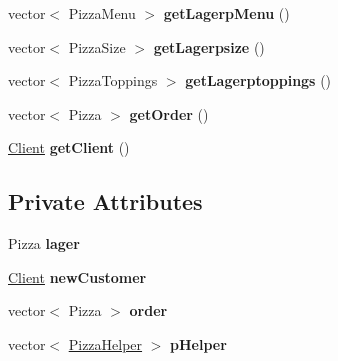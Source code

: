 \begin{CompactItemize}
\item 
\hypertarget{class_sala_89b38b3e2a9835524c9fd21628f485cc}{
vector$<$ Pizza\-Menu $>$ {\bf get\-Lagerp\-Menu} ()}
\label{class_sala_89b38b3e2a9835524c9fd21628f485cc}

\item 
\hypertarget{class_sala_3b0fc00a14ac87f5c78a4ec2f508d67b}{
vector$<$ Pizza\-Size $>$ {\bf get\-Lagerpsize} ()}
\label{class_sala_3b0fc00a14ac87f5c78a4ec2f508d67b}

\item 
\hypertarget{class_sala_aeb754b87d63d395a61539294cbdf064}{
vector$<$ Pizza\-Toppings $>$ {\bf get\-Lagerptoppings} ()}
\label{class_sala_aeb754b87d63d395a61539294cbdf064}

\item 
\hypertarget{class_sala_71e41a58a2a9c2d1927676693909a42c}{
vector$<$ Pizza $>$ {\bf get\-Order} ()}
\label{class_sala_71e41a58a2a9c2d1927676693909a42c}

\item 
\hypertarget{class_sala_a1300ce1d3137fc3bd1b2938612faa1b}{
\hyperlink{class_client}{Client} {\bf get\-Client} ()}
\label{class_sala_a1300ce1d3137fc3bd1b2938612faa1b}

\end{CompactItemize}
\subsection*{Private Attributes}
\begin{CompactItemize}
\item 
\hypertarget{class_sala_0f90fe5c344e62852b747ecbdc5b5d90}{
Pizza {\bf lager}}
\label{class_sala_0f90fe5c344e62852b747ecbdc5b5d90}

\item 
\hypertarget{class_sala_d6980eaf5555befe23d2271575d6d9cb}{
\hyperlink{class_client}{Client} {\bf new\-Customer}}
\label{class_sala_d6980eaf5555befe23d2271575d6d9cb}

\item 
\hypertarget{class_sala_70a17ffa722a3985b86d30b034ad06d7}{
vector$<$ Pizza $>$ {\bf order}}
\label{class_sala_70a17ffa722a3985b86d30b034ad06d7}

\item 
\hypertarget{class_sala_4b1abb1f80ebc80a2334733ae62acde2}{
vector$<$ \hyperlink{class_pizza_helper}{Pizza\-Helper} $>$ {\bf p\-Helper}}
\label{class_sala_4b1abb1f80ebc80a2334733ae62acde2}

\end{CompactItemize}

